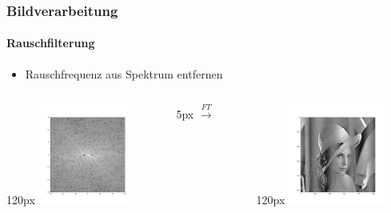 \begin{frame}
    \frametitle{Bildverarbeitung}
    \framesubtitle{Rauschfilterung}

    \begin{itemize}
        \item Rauschfrequenz aus Spektrum entfernen
    \end{itemize}

    \begin{columns}
        \begin{column}{120px}
            \includegraphics[width=120px]{images/04-applications-image-lena-cos-ft-fixed.png} 
        \end{column}    
        \hspace*{-30px}
        \begin{column}{5px}
            $\overset{FT}{\longrightarrow}$
        \end{column}
        \hspace*{-30px}
        \begin{column}{120px}
            \includegraphics[width=120px]{images/04-applications-image-lena-cos-fixed.png}
        \end{column}
    \end{columns}
\end{frame}
